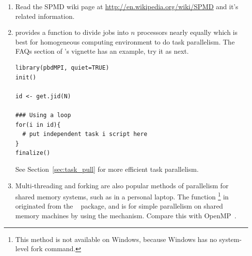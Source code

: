 \begin{enumerate}[label=\thechapter-\arabic*]
\item
Read the SPMD wiki page at \url{http://en.wikipedia.org/wiki/SPMD} and it's related information.


\item \label{ch2:exercise:2}
 provides a function 
to divide  jobs into $n$ processors nearly equally which is best
for homogeneous computing environment to do task parallelism.
The FAQs section of 's vignette has an example, try it as next.
\begin{lstlisting}[language=rr,title=R Code]
library(pbdMPI, quiet=TRUE)
init()

id <- get.jid(N)

### Using a loop
for(i in id){
  # put independent task i script here
}
finalize()
\end{lstlisting}
See Section~\ref{sec:task_pull} for more efficient task parallelism.

\item
Multi-threading and 
forking are also popular methods of parallelism for 
shared memory systems, such as in a personal laptop. The function 
\footnote{This method is not 
available on Windows, because Windows has no system-level fork command.} in 
 originated from the
~\citep{multicore}
package, and is for simple parallelism on shared memory machines by using the 
 mechanism. Compare this with 
OpenMP~\citep{OpenMP}.


\end{enumerate}

